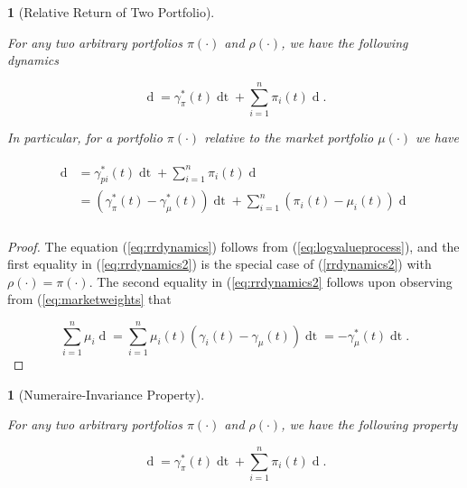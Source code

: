 \documentclass[british]{amsart}
\numberwithin{equation}{section}
\numberwithin{figure}{section}
\theoremstyle{plain}
\theoremstyle{definition}
\theoremstyle{plain}
\theoremstyle{plain}
\newtheorem{lem}[thm]{\protect\lemmaname}
\theoremstyle{plain}
\theoremstyle{remark}
\theoremstyle{plain}
\providecommand{\lemmaname}{Lemma}
\renewcommand{\d}[1]{\mathop{\mathrm{d}{#1}}}
\begin{document}
\begin{lem} [Relative Return of Two Portfolio]
\label{lem:relativereturnoftwoportfolios}

  For any two arbitrary portfolios $\pi(\cdot)$ and $\rho(\cdot)$, we have the
following dynamics

  \begin{equation} \label{eq:rrdynamics} \d{ \log{ \left( \frac{ V^{\pi}(t) }{
V^{\rho}(t) } \right) } } = \gamma_{\pi}^{*}(t)\d{t} + \sum_{i=1}^{n} \pi_{i}(t)
\d{ \log{ \left( \frac{ X_{i}(t) }{ V^{\rho}(t)} \right) }}. \end{equation}

  In particular, for a portfolio $\pi(\cdot)$ relative to the market portfolio
$\mu(\cdot)$ we have

  \begin{gather*} \label{eq:rrdynamics2} \begin{split} \d{ \log{ \left( \frac{
V^(t) }{ V^{\mu}(t) } \right) } } &= \gamma_{pi}^{*}(t)\d{t} + \sum_{i=1}^{n}
\pi_{i}(t)  \d{ \log{\mu_{i}(t)} } \\ &= (\gamma_{\pi}^{*}(t) -
\gamma_{\mu}^{*}(t)) \d{t} + \sum_{i=1}^{n} (\pi_{i}(t) - \mu_{i}(t)) \d{
\log{\mu_{i}(t)} } \\ \end{split} \end{gather*}

\end{lem}

\begin{proof}

  The equation (\ref{eq:rrdynamics}) follows from (\ref{eq:logvalueprocess}),
and the first equality in (\ref{eq:rrdynamics2}) is the special case of
(\ref{rrdynamics2}) with $\rho(\cdot) = \pi(\cdot)$. The second equality in
(\ref{eq:rrdynamics2} follows upon observing from (\ref{eq:marketweights} that

  \begin{equation*} \sum_{i=1}^{n} \mu_{i}\d{\log{\mu_{i}(t)}} = \sum_{i=1}^{n}
\mu_{i}(t)(\gamma_{i}(t)-\gamma_{\mu}(t))\d{t} = -\gamma_{\mu}^{*}(t)\d{t}.
\end{equation*}

\end{proof}

\begin{lem} [Numeraire-Invariance Property]
\label{lem:relativereturnoftwoportfolios}

  For any two arbitrary portfolios $\pi(\cdot)$ and $\rho(\cdot)$, we have the
following property 

  \begin{equation*} \d{ \log{ \left( \frac{ V^{\pi}(t) }{ V^{\rho}(t) } \right)
} } = \gamma_{\pi}^{*}(t)\d{t} + \sum_{i=1}^{n} \pi_{i}(t) \d{ \log{ \left(
\frac{ X_{i}(t) }{ V^{\rho}(t)} \right) }}. \end{equation*}

  
\end{lem}
\end{document}
